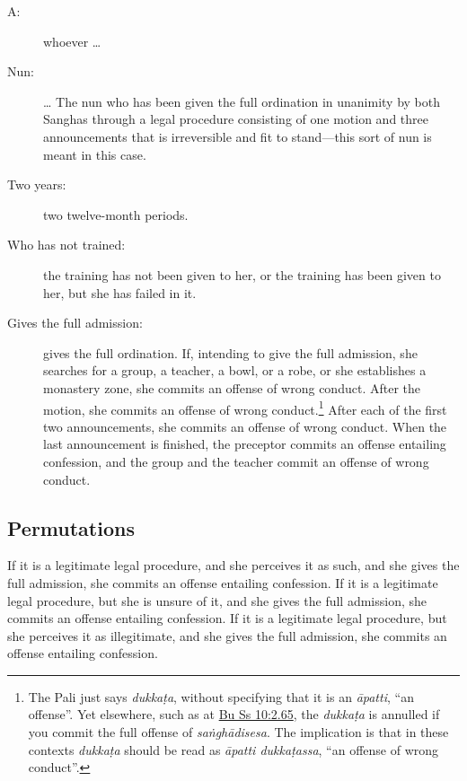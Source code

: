 \documentclass[12pt,openany]{book}%
\begin{document}
\begin{description}%
\item[A: ] whoever … %
\item[Nun: ] … The nun who has been given the full ordination in unanimity by both Sanghas through a legal procedure consisting of one motion and three announcements that is irreversible and fit to stand—this sort of nun is meant in this case. %
\item[Two years: ] two twelve-month periods. %
\item[Who has not trained: ] the training has not been given to her, or the training has been given to her, but she has failed in it. %
\item[Gives the full admission: ] gives the full ordination. If, intending to give the full admission, she searches for a group, a teacher, a bowl, or a robe, or she establishes a monastery zone, she commits an offense of wrong conduct. After the motion, she commits an offense of wrong conduct.\footnote{The Pali just says \textit{\textsanskrit{dukkaṭa}}, without specifying that it is an \textit{\textsanskrit{āpatti}}, “an offense”. Yet elsewhere, such as at \href{https://suttacentral.net/pli-tv-bu-vb-ss10/en/brahmali\#2.65}{Bu Ss 10:2.65}, the \textit{\textsanskrit{dukkaṭa}} is annulled if you commit the full offense of \textit{\textsanskrit{saṅghādisesa}}. The implication is that in these contexts \textit{\textsanskrit{dukkaṭa}} should be read as \textit{\textsanskrit{āpatti} \textsanskrit{dukkaṭassa}}, “an offense of wrong conduct”. } After each of the first two announcements, she commits an offense of wrong conduct. When the last announcement is finished, the preceptor commits an offense entailing confession, and the group and the teacher commit an offense of wrong conduct. %
\end{description}

\subsection*{Permutations }

If it is a legitimate legal procedure, and she perceives it as such, and she gives the full admission, she commits an offense entailing confession. If it is a legitimate legal procedure, but she is unsure of it, and she gives the full admission, she commits an offense entailing confession. If it is a legitimate legal procedure, but she perceives it as illegitimate, and she gives the full admission, she commits an offense entailing confession. 
\end{document}
